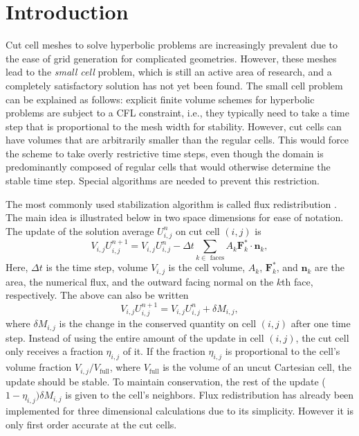 \section{Introduction}\label{sec:intro}
Cut cell meshes to solve hyperbolic problems 
are increasingly prevalent due to the ease 
of grid generation for complicated geometries. 
However, these meshes lead to the {\em small cell} problem, which
is still an active area of research, and  
a completely satisfactory solution has not yet been found.
The small cell problem can be explained as follows: explicit
finite volume schemes for hyperbolic problems are subject to a CFL constraint, i.e.,  they typically need to take a time step that is proportional to the mesh width for
stability. However, cut cells can have volumes that are arbitrarily smaller than the regular cells.  This would force the scheme to take overly restrictive time steps, even though the domain is predominantly composed of regular cells that would otherwise determine the stable time step. Special algorithms are needed to prevent this restriction.

The most commonly used stabilization algorithm is called flux
redistribution \cite{chern:colella,vof:colella}. The main idea is illustrated below in two space
dimensions for ease of notation.
The update of the solution average 
$U^n_{i,j}$ on cut cell $(i,j)$  is
\begin{equation*}
V_{i,j} U_{i,j} ^{n+1}  = V_{i,j} U_{i,j}^n  -  \Delta t \sum_{k \in \text{ faces}}A_k \mathbf{F}_k^* \cdot \mathbf{n}_k,
\end{equation*}
Here, $\Delta t$ is the time step,
volume $V_{i,j}$ is the cell volume,
$A_k$, $\mathbf{F}_k^*$, and $\mathbf{n}_k$ are the area, the numerical flux, and the outward facing normal on the $k$th face, respectively.
The above can also be written
\begin{equation*}
V_{i,j} U_{i,j} ^{n+1} = V_{i,j} U_{i,j}^n  +  \delta  M_{i,j} ,
\end{equation*}
where $\delta M_{i,j}$ is the change in the conserved quantity 
on cell $(i,j)$ after one time step.
Instead of using the entire amount of the update in cell $(i,j)$, 
the cut cell only receives a fraction $\eta_{i,j}$ of it.  If the fraction $\eta_{i,j}$
is proportional to the cell's volume fraction $V_{i,j}/V_{\text{full}}$,
where $V_{\text{full}}$ is the volume of an uncut Cartesian cell, the update should be stable. 
To maintain conservation, the rest of the update ($1-\eta_{i,j})\delta M_{i,j}$
is given to the cell's neighbors.  
Flux redistribution has already been implemented for three dimensional
calculations due to its simplicity. However it is only first order accurate at the cut cells.


